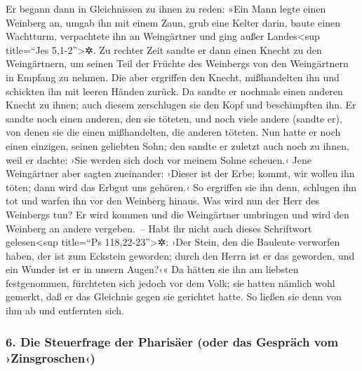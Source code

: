  Er begann dann in Gleichnissen zu ihnen zu reden: »Ein
Mann legte einen Weinberg an, umgab ihn mit einem Zaun, grub eine Kelter
darin, baute einen Wachtturm, verpachtete ihn an Weingärtner und ging
außer Landes\textless sup title=``Jes 5,1-2''\textgreater✲.
 Zu rechter Zeit sandte er dann einen Knecht zu den
Weingärtnern, um seinen Teil der Früchte des Weinbergs von den
Weingärtnern in Empfang zu nehmen.  Die aber ergriffen den
Knecht, mißhandelten ihn und schickten ihn mit leeren Händen zurück.
 Da sandte er nochmals einen anderen Knecht zu ihnen; auch
diesem zerschlugen sie den Kopf und beschimpften ihn.  Er
sandte noch einen anderen, den sie töteten, und noch viele andere
(sandte er), von denen sie die einen mißhandelten, die anderen töteten.
 Nun hatte er noch einen einzigen, seinen geliebten Sohn;
den sandte er zuletzt auch noch zu ihnen, weil er dachte: ›Sie werden
sich doch vor meinem Sohne scheuen.‹  Jene Weingärtner
aber sagten zueinander: ›Dieser ist der Erbe; kommt, wir wollen ihn
töten; dann wird das Erbgut uns gehören.‹  So ergriffen
sie ihn denn, schlugen ihn tot und warfen ihn vor den Weinberg hinaus.
 Was wird nun der Herr des Weinbergs tun? Er wird kommen
und die Weingärtner umbringen und wird den Weinberg an andere
vergeben.~--  Habt ihr nicht auch dieses Schriftwort
gelesen\textless sup title=``Ps 118,22-23''\textgreater✲: ›Der Stein,
den die Bauleute verworfen haben, der ist zum Eckstein geworden;
 durch den Herrn ist er das geworden, und ein Wunder ist
er in unsern Augen?‹«  Da hätten sie ihn am liebsten
festgenommen, fürchteten sich jedoch vor dem Volk; sie hatten nämlich
wohl gemerkt, daß er das Gleichnis gegen sie gerichtet hatte. So ließen
sie denn von ihm ab und entfernten sich.

\hypertarget{die-steuerfrage-der-pharisuxe4er-oder-das-gespruxe4ch-vom-zinsgroschen}{%
\subsubsection{6. Die Steuerfrage der Pharisäer (oder das Gespräch vom
›Zinsgroschen‹)}\label{die-steuerfrage-der-pharisuxe4er-oder-das-gespruxe4ch-vom-zinsgroschen}}

